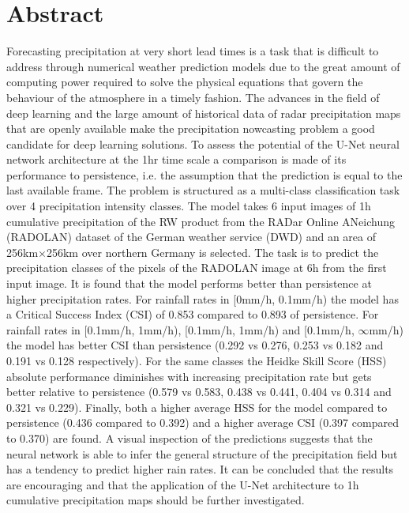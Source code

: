 \chapter*{Abstract}
\thispagestyle{plain}

Forecasting precipitation at very short lead times is a task that is difficult to address through numerical weather prediction models due to the great amount of computing power required to solve the physical equations that govern the behaviour of the atmosphere in a timely fashion. The advances in the field of deep learning and the large amount of historical data of radar precipitation maps that are openly available make the precipitation nowcasting problem a good candidate for deep learning solutions. To assess the potential of the U-Net neural network architecture at the 1hr time scale a comparison is made of its performance to persistence, i.e. the assumption that the prediction is equal to the last available frame. The problem is structured as a multi-class classification task over 4 precipitation intensity classes. The model takes 6 input images of 1h cumulative precipitation of the RW product from the RADar Online ANeichung (RADOLAN) dataset of the German weather service (DWD) and an area of 256km$\times$256km over northern Germany is selected. The task is to predict the precipitation classes of the pixels of the RADOLAN image at 6h from the first input image. It is found that the model performs better than persistence at higher precipitation rates. For rainfall rates in [0mm/h, 0.1mm/h) the model has a Critical Success Index (CSI) of 0.853 compared to 0.893 of persistence. For rainfall rates in [0.1mm/h, 1mm/h), [0.1mm/h, 1mm/h) and [0.1mm/h, $\infty$mm/h) the model has better CSI than persistence (0.292 vs 0.276, 0.253 vs 0.182 and 0.191 vs 0.128 respectively). For the same classes the Heidke Skill Score (HSS) absolute performance diminishes with increasing precipitation rate but gets better relative to persistence (0.579 vs 0.583, 0.438 vs 0.441, 0.404 vs 0.314 and 0.321 vs 0.229). Finally, both a higher average HSS for the model compared to persistence (0.436 compared to 0.392) and a higher average CSI (0.397 compared to 0.370) are found. A visual inspection of the predictions suggests that the neural network is able to infer the general structure of the precipitation field but has a tendency to predict higher rain rates. It can be concluded that the results are encouraging and that the application of the U-Net architecture to 1h cumulative precipitation maps should be further investigated.
